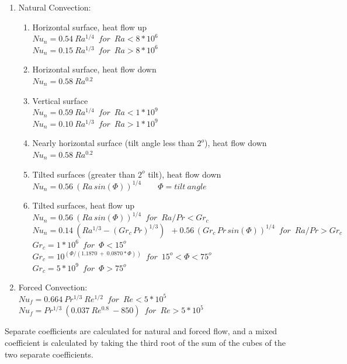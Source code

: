 \begin{enumerate}
   \item Natural Convection:
   \begin{enumerate}
     \item Horizontal surface, heat flow up \\
     $Nu_n = 0.54 \: Ra^{1/4} \enspace for \enspace Ra < 8 * 10^6$ \\
     $Nu_n = 0.15 \: Ra^{1/3} \enspace for \enspace Ra > 8 * 10^6$
     \item Horizontal surface, heat flow down \\
     $Nu_n = 0.58 \: Ra^{0.2}$
     \item Vertical surface \\
     $Nu_n = 0.59 \: Ra^{1/4} \enspace for \enspace Ra < 1 * 10^9$ \\
     $Nu_n = 0.10 \: Ra^{1/3} \enspace for \enspace Ra > 1 * 10^9$
     \item Nearly horizontal surface (tilt angle less than $2^o$), heat flow down \\
     $Nu_n = 0.58 \: Ra^{0.2}$
     \item Tilted surfaces (greater than $2^o$ tilt), heat flow down \\
     $Nu_n = 0.56 \: (Ra \, sin (\Phi))^{1/4} \qquad  \Phi = tilt \: angle$
     \item Tilted surfaces, heat flow up \\
     $Nu_n = 0.56 \: (Ra \, sin (\Phi))^{1/4} \enspace for \enspace Ra/Pr < Gr_c$ \\
     $Nu_n = 0.14 \: (Ra^{1/3}- (Gr_c\,Pr)^{1/3})
     \enspace + 0.56\,(Gr_c \, Pr \, sin (\Phi))^{1/4} \enspace for \enspace Ra/Pr > Gr_c$ \\
     $Gr_c = 1 * 10^6 \enspace for \enspace \Phi < 15^o $ \\
     $Gr_c = 10^{(\Phi / (1.1870\:+\:0.0870*\Phi))} \enspace for \enspace 15^o < \Phi < 75^o $ \\
     $Gr_c = 5 * 10^9 \enspace for \enspace \Phi > 75^o $
   \end{enumerate}
   \item Forced Convection: \\
   $Nu_f = 0.664 \: Pr^{1/3} \: Re^{1/2} \enspace for \enspace Re < 5 * 10^5$ \\
   $Nu_f = Pr^{1/3} \: (0.037 \: Re^{0.8} \: - 850) \enspace for \enspace Re > 5 * 10^5$
\end{enumerate}

Separate coefficients are calculated for natural and forced flow, and a mixed coefficient is calculated by taking the third root of the sum of the cubes of the two separate coefficients.

